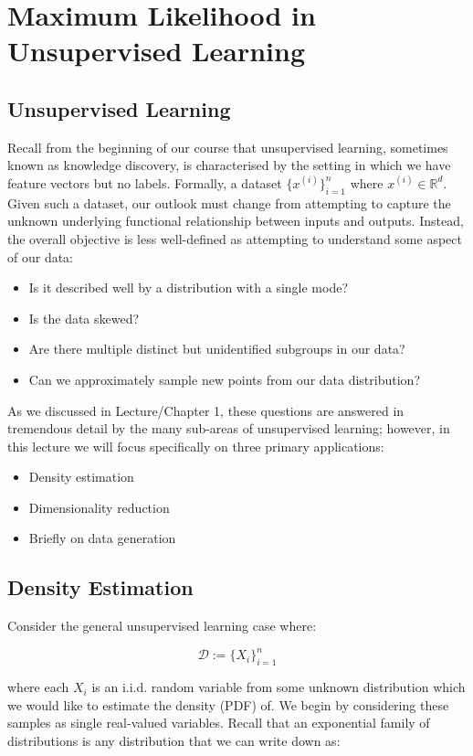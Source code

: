 \chapter{Maximum Likelihood in Unsupervised Learning}
\section{Unsupervised Learning}

Recall from the beginning of our course that unsupervised learning, sometimes known as knowledge discovery, is characterised by the setting in which we have feature vectors but no labels. Formally, a dataset $\{x^{(i)}\}_{i=1}^n$ where $x^{(i)}\in\mathbb{R}^{d}$. Given such a dataset, our outlook must change from attempting to capture the unknown underlying functional relationship between inputs and outputs. Instead, the overall objective is less well-defined as attempting to understand some aspect of our data:
\begin{itemize}
    \item Is it described well by a distribution with a single mode?
    \item Is the data skewed?
    \item Are there multiple distinct but unidentified subgroups in our data?
    \item Can we approximately sample new points from our data distribution?
\end{itemize}

As we discussed in Lecture/Chapter 1, these questions are answered in tremendous detail by the many sub-areas of unsupervised learning; however, in this lecture we will focus specifically on three primary applications:
\begin{itemize}
    \item Density estimation
    \item Dimensionality reduction
    \item Briefly on data generation
\end{itemize}

\section{Density Estimation}

Consider the general unsupervised learning case where:

\[
    \mathcal{D}:=\{X_i\}_{i=1}^n
\]

where each $X_{i}$ is an i.i.d. random variable from some unknown distribution which we would like to estimate the density (PDF) of. We begin by considering these samples as single real-valued variables. Recall that an exponential family of distributions is any distribution that we can write down as:

